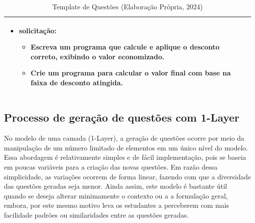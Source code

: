 \begin{table}[htbp]
\begin{tabular}{|l|p{10cm}|}
\begin{itemize}[leftmargin=1em]
  \item \textbf{solicitação}:
    \begin{itemize}[leftmargin=1em]
      \item Escreva um programa que calcule e aplique o desconto correto, exibindo o valor economizado.
      \item Crie um programa para calcular o valor final com base na faixa de desconto atingida.
    \end{itemize}
\end{itemize}\\
\hline

\end{tabular}
\caption{Template de Questões (Elaboração Própria, 2024)}
\label{tab:template-questoes-elementos}
\end{table}




\subsection{Processo de geração de questões com 1-Layer}

No modelo de uma camada (1-Layer), a geração de questões ocorre por meio da manipulação de um número limitado de elementos em um único nível do modelo. Essa abordagem é relativamente simples e de fácil implementação, pois se baseia em poucas variáveis para a criação das novas questões. Em razão dessa simplicidade, as variações ocorrem de forma linear, fazendo com que a diversidade das questões geradas seja menor. Ainda assim, este modelo é bastante útil quando se deseja alterar minimamente o contexto ou a a formulação geral, embora, por este mesmo motivo leva os estudantes a perceberem com mais facilidade padrões ou similaridades entre as questões geradas. 




